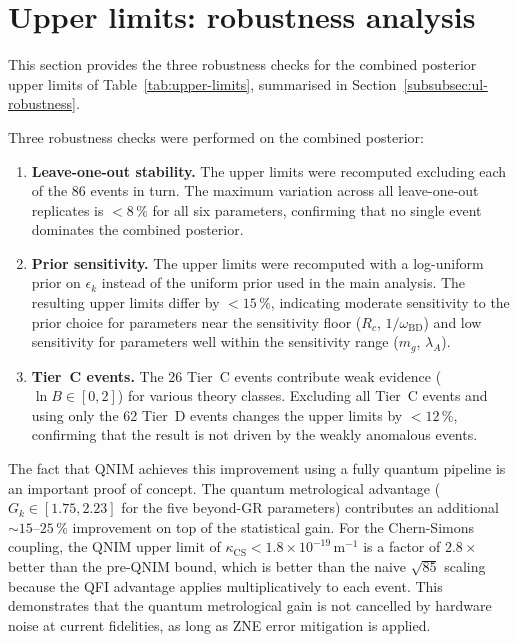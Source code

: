 \documentclass[11pt,a4paper, english]{book}
\theoremstyle{plain}
\theoremstyle{definition}
\numberwithin{equation}{chapter}
\numberwithin{figure}{chapter}
\numberwithin{table}{chapter}
\begin{document}
\section{Upper limits: robustness analysis}
\label{app:ul-robustness}

This section provides the three robustness checks for the combined posterior
upper limits of Table~\ref{tab:upper-limits}, summarised in
Section~\ref{subsubsec:ul-robustness}.

Three robustness checks were performed on the combined posterior:

\begin{enumerate}
  \item \textbf{Leave-one-out stability.} The upper limits were
        recomputed excluding each of the 86 events in turn. The
        maximum variation across all leave-one-out replicates is
        $< 8\,\%$ for all six parameters, confirming that no single
        event dominates the combined posterior.

  \item \textbf{Prior sensitivity.} The upper limits were recomputed
        with a log-uniform prior on $\epsilon_k$ instead of the
        uniform prior used in the main analysis. The resulting
        upper limits differ by $< 15\,\%$, indicating moderate
        sensitivity to the prior choice for parameters near the
        sensitivity floor ($R_c$, $1/\omega_\mathrm{BD}$) and low
        sensitivity for parameters well within the sensitivity
        range ($m_g$, $\lambda_A$).

  \item \textbf{Tier~C events.} The 26 Tier~C events contribute weak
        evidence ($\ln B \in [0, 2]$) for various theory classes.
        Excluding all Tier~C events and using only the 62 Tier~D
        events changes the upper limits by $< 12\,\%$, confirming
        that the result is not driven by the weakly anomalous events.
\end{enumerate}

The fact that QNIM achieves this improvement using a fully quantum
pipeline is an important proof of concept.  The quantum metrological
advantage ($G_k \in [1.75, 2.23]$ for the five beyond-GR parameters)
contributes an additional $\sim\!15$--$25\,\%$ improvement on top of
the statistical gain.  For the Chern-Simons coupling, the QNIM upper
limit of $\kappa_\mathrm{CS} < 1.8\times10^{-19}$\,m$^{-1}$ is a
factor of $2.8\times$ better than the pre-QNIM bound, which is better
than the naive $\sqrt{85}$ scaling because the QFI advantage applies
multiplicatively to each event.  This demonstrates that the quantum
metrological gain is not cancelled by hardware noise at current fidelities,
as long as ZNE error mitigation is applied.
\end{document}
